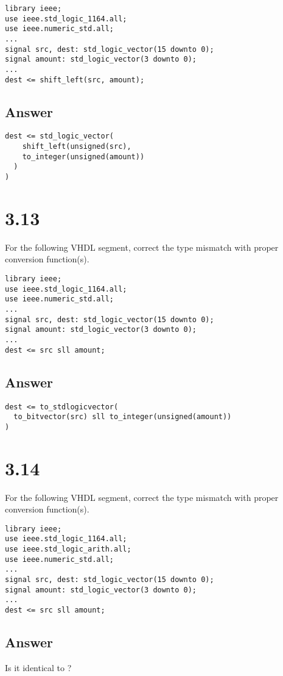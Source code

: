 \documentclass[dvipsnames, svgnames, x11names, a4paper,12pt]{article}
\begin{document}
\begin{lstlisting}
library ieee;
use ieee.std_logic_1164.all;
use ieee.numeric_std.all;
...
signal src, dest: std_logic_vector(15 downto 0);
signal amount: std_logic_vector(3 downto 0);
...
dest <= shift_left(src, amount);
\end{lstlisting}
\subsection{Answer}
\begin{lstlisting}
dest <= std_logic_vector(
    shift_left(unsigned(src), 
    to_integer(unsigned(amount))
  )
)
\end{lstlisting}
\section{3.13}\label{3.13}
For the following VHDL segment, correct the type mismatch with proper conversion
function(s).
\begin{lstlisting}
library ieee;
use ieee.std_logic_1164.all;
use ieee.numeric_std.all;
...
signal src, dest: std_logic_vector(15 downto 0);
signal amount: std_logic_vector(3 downto 0);
...
dest <= src sll amount;   
\end{lstlisting}
\subsection{Answer}
\begin{lstlisting}
dest <= to_stdlogicvector(
  to_bitvector(src) sll to_integer(unsigned(amount))
)
\end{lstlisting}
\section{3.14}    
 For the following VHDL segment, correct the type mismatch with proper conversion
function(s).
\begin{lstlisting}
library ieee;
use ieee.std_logic_1164.all;
use ieee.std_logic_arith.all;
use ieee.numeric_std.all;
...
signal src, dest: std_logic_vector(15 downto 0);
signal amount: std_logic_vector(3 downto 0);
...
dest <= src sll amount;
\end{lstlisting}
\subsection{Answer}
Is it identical to ?
\end{document}
